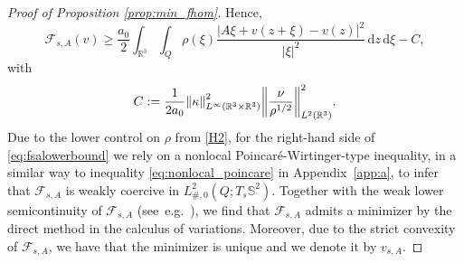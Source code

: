 \documentclass[reqno,11pt]{amsart}
\numberwithin{equation}{section}
\theoremstyle{thmlemcorr}
\numberwithin{theorem}{section}
\theoremstyle{thmlemcorr*}
\theoremstyle{defi}
\theoremstyle{remexample}
\theoremstyle{ass}
\newcommand{\R}{\mathbb{R}}
\renewcommand{\S}{\mathbb{S}}
\newcommand{\Fcal}{\mathcal{F}}
\newcommand{\dd}{\,\mathrm{d}}
\DeclarePairedDelimiter{\abs}{\lvert}{\rvert}
\DeclarePairedDelimiter{\norm}{\lVert}{\rVert}
\newcommand{\1}{\mathds{1}}
\begin{document}
\begin{proof}[Proof of Proposition \ref{prop:min_fhom}]
    Hence, %
    \begin{equation}\label{eq:fsalowerbound}
    \Fcal_{s,A}(v) \geq \frac{a_0}{2} \int_{\R^3}\int_{Q}\rho(\xi)\frac{|A\xi +v(z+\xi)-v(z)|^2}{|\xi|^2}\dd z\dd \xi - C, 
    \end{equation}
    with 
    \begin{equation*}
        C:= \frac{1}{2 a_0} \norm*{\kappa}^2_{L^\infty(\R^3\times \R^3)}\norm*{\frac{\nu}{\rho^{1/2}}}^{2}_{L^{2}(\R^3)}.
    \end{equation*}
    Due to the lower control on $\rho$ from \ref{H2}, for the right-hand side of  \eqref{eq:fsalowerbound} we rely on a nonlocal Poincar\'{e}-Wirtinger-type inequality, in a similar way to inequality \eqref{eq:nonlocal_poincare} in Appendix~\ref{app:a}, to infer that $\Fcal_{s,A}$ is weakly coercive in $L^2_{\#,0}(Q;T_s\S^2)$. Together with the weak lower semicontinuity of $\Fcal_{s,A}$ (see~e.g.~\cite[Theorem~6.54]{FoL07}), we find that $\Fcal_{s,A}$ admits a minimizer by the direct method in the calculus of variations. Moreover, due to the strict convexity of $\Fcal_{s,A}$, we have that the minimizer is unique and we denote it by $v_{s,A}$. 
    

\end{proof}
\end{document}
